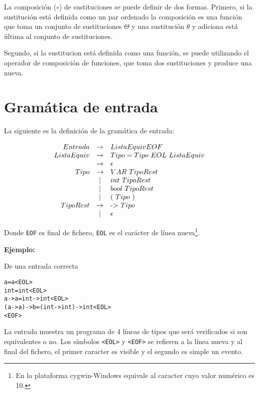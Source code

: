 \documentclass{article}
\begin{document}
La composición ($\circ$) de sustituciones se puede definir de dos
formas. Primero, si la sustitución está definida como un par ordenado
la composición es una función que toma un conjunto de sustituciones
$\Theta$ y una sustitución $\theta$ y adiciona está última al conjunto
de sustituciones.

Segundo, si la sustitucion está definida como una
función, se puede utilizando el operador de composición de funciones,
que toma dos sustituciones y produce una nueva.

\section{Gramática de entrada}
\label{sec:gramatica-de-entrada}

La siguiente es la definición de la gramática de entrada:

\[
  \begin{array}[h]{rcl}
    Entrada & \to  & ListaEquiv EOF \\
    ListaEquiv & \to & Tipo = Tipo\ EOL\ ListaEquiv\\
            & \to & \epsilon \\
    Tipo    & \to & VAR\  TipoRest\\
            & \mid & int\ TipoRest\\
            & \mid & bool\ TipoRest \\
            & \mid & (\ Tipo\ ) \\
    TipoRest & \to & \text{-$>$}\ Tipo \\
             & \mid & \epsilon \\
  \end{array}
\]

Donde \texttt{EOF} es final de fichero, \texttt{EOL} es el carácter de
línea nueva\footnote{En la plataforma cygwin-Windows equivale al
  caracter cuyo valor numérico es 10.}.

\textbf{Ejemplo:}

De una entrada correcta

\begin{alltt}
a = a <EOL>
int = int <EOL>
a -> a = int -> int <EOL>
(a -> a) -> b = (int -> int) -> int <EOL>
<EOF>
\end{alltt}

La entrada muestra un programa de 4 líneas de tipos que será
verificados si son equivalentes o no. Los símbolos \verb!<EOL>! y
\verb!<EOF>! se refieren a la línea nueva y al final del fichero, el
primer caracter es visible y el segundo es simple un evento.
\end{document}
